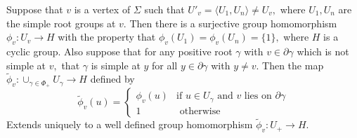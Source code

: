 \documentclass[class=book, crop=false,12 pt]{standalone}
\begin{document}
\begin{lemma}
	\label{lem:existence}
	Suppose that $v$ is a vertex of $\Sigma$ such that $U'_v=\langle U_1,U_n\rangle\neq U_v,$ where $U_1,U_n$ are the simple root groups at $v.$ Then there is a surjective group homomorphism $\phi_v:U_v\to H$ with the property that $\phi_v(U_1)=\phi_v(U_n)=\{1\},$ where $H$ is a cyclic group. Also suppose that for any positive root $\gamma$ with $v\in \partial \gamma$ which is not simple at $v,$ that $\gamma$ is simple at $y$ for all $y\in \partial \gamma$ with $y\neq v.$ Then the map $\tilde{\phi}_v:\cup_{\gamma\in \Phi_+}U_\gamma\to H$ defined by
\[
	\tilde{\phi}_v(u)=\begin{cases} \phi_v(u)&\text{if }u\in U_\gamma\text{ and }v\text{ lies on }\partial\gamma\\
		1&\text{ otherwise}
	\end{cases}
\]
Extends uniquely to a well defined group homomorphism $\tilde{\phi}_v:U_+\to H.$
\end{lemma}
\end{document}
